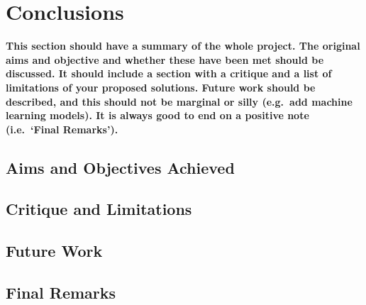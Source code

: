 \chapter{Conclusions}
\textbf{This section should have a summary of the whole project.  The original aims and objective and whether these have been met should be discussed. It should include a section with a critique and a list of limitations of your proposed solutions.  Future work should be described, and this should not be marginal or silly (e.g.\ add machine learning models).  It is always good to end on a positive note (i.e.\ `Final Remarks').}

\section{Aims and Objectives Achieved}
\blindtext

\section{Critique and Limitations}
\blindtext

\section{Future Work}
\blindtext

\section{Final Remarks}
\blindtext
